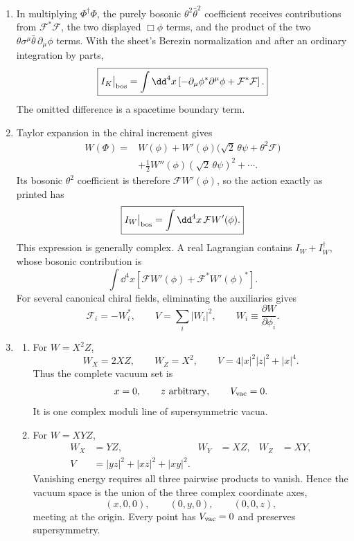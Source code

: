 \begin{enumerate}
\begin{enumerate}
    \item[(b)] In multiplying \(\Phi^\dagger\Phi\), the purely bosonic
    \(\theta^2\bar\theta^2\) coefficient receives contributions from
    \(\mathcal F^*\mathcal F\), the two displayed \(\Box\phi\) terms, and
    the product of the two
    \(\theta\sigma^\mu\bar\theta\,\partial_\mu\phi\) terms.  With the
    sheet's Berezin normalization and after an ordinary integration by parts,
    \[
      \boxed{
      I_K\big|_{\rm bos}
        =\int \dd^4x\left[
          -\partial_\mu\phi^*\partial^\mu\phi
          +\mathcal F^*\mathcal F
        \right].}
    \]
    The omitted difference is a spacetime boundary term.

    \item[(c)] Taylor expansion in the chiral increment gives
    \[
      \begin{aligned}
        W(\Phi)={}&W(\phi)
          +W'(\phi)\bigl(\sqrt2\,\theta\psi+\theta^2\mathcal F\bigr)\\
          &+\frac12W''(\phi)(\sqrt2\,\theta\psi)^2+\cdots .
      \end{aligned}
    \]
    Its bosonic \(\theta^2\) coefficient is therefore
    \(\mathcal F W'(\phi)\), so the action exactly as printed has
    \[
      \boxed{
      I_W\big|_{\rm bos}
        =\int \dd^4x\,\mathcal F W'(\phi).}
    \]
    This expression is generally complex.  A real Lagrangian contains
    \(I_W+I_W^\dagger\), whose bosonic contribution is
    \[
      \int \dd^4x\left[
        \mathcal F W'(\phi)
        +\mathcal F^*W'(\phi)^*
      \right].
    \]
    For several canonical chiral fields, eliminating the auxiliaries gives
    \[
      \mathcal F_i=-W_i^*,\qquad
      V=\sum_i|W_i|^2,\qquad W_i\equiv\frac{\partial W}{\partial\phi_i}.
    \]

    \item[(d)]
    \begin{enumerate}
      \item[(i)] For \(W=X^2Z\),
      \[
        W_X=2XZ,\qquad W_Z=X^2,\qquad
        V=4|x|^2|z|^2+|x|^4.
      \]
      Thus the complete vacuum set is
      \[
        x=0,\qquad z\ \hbox{arbitrary},\qquad V_{\rm vac}=0.
      \]
      It is one complex moduli line of supersymmetric vacua.

      \item[(ii)] For \(W=XYZ\),
      \[
        \begin{aligned}
          W_X&=YZ,& W_Y&=XZ,& W_Z&=XY,\\
          V&=|yz|^2+|xz|^2+|xy|^2.
        \end{aligned}
      \]
      Vanishing energy requires all three pairwise products to vanish.
      Hence the vacuum space is the union of the three complex coordinate
      axes,
      \[
        (x,0,0),\qquad(0,y,0),\qquad(0,0,z),
      \]
      meeting at the origin.  Every point has \(V_{\rm vac}=0\) and preserves
      supersymmetry.


\end{enumerate}
\end{enumerate}
\end{enumerate}

